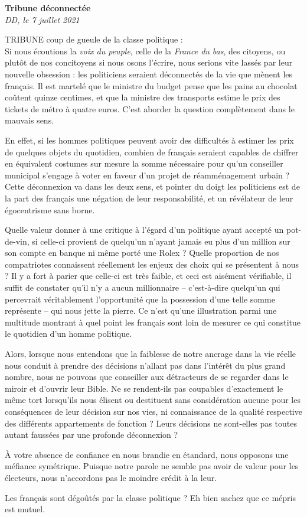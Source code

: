 \documentclass[french,12pt,amstex,a4paper]{article}
\begin{document}
\begin{center}
{\bf Tribune déconnectée}\\
{\it DD, le 7 juillet 2021}\\
\end{center}

TRIBUNE coup de gueule de la classe politique :\\

Si nous écoutions la {\it voix du peuple}, celle de la {\it France du bas}, des citoyens, ou plutôt de nos concitoyens si nous osons l'écrire, nous serions vite lassés par leur nouvelle obsession : les politiciens seraient déconnectés de la vie que mènent les français. Il est martelé que le ministre du budget pense que les pains au chocolat coûtent quinze centimes, et que la ministre des transports estime le prix des tickets de métro à quatre euros. C'est aborder la question complètement dans le mauvais sens.

En effet, si les hommes politiques peuvent avoir des difficultés à estimer les prix de quelques objets du quotidien, combien de français seraient capables de chiffrer en équivalent costumes sur mesure la somme nécessaire pour qu'un conseiller municipal s'engage à voter en faveur d'un projet de réamménagement urbain ? Cette déconnexion va dans les deux sens, et pointer du doigt les politiciens est de la part des français une négation de leur responsabilité, et un révélateur de leur égocentrisme sans borne.

Quelle valeur donner à une critique à l'égard d'un politique ayant accepté un pot-de-vin, si celle-ci provient de quelqu'un n'ayant jamais eu plus d'un million sur son compte en banque ni même porté une Rolex ? Quelle proportion de nos compatriotes connaissent réellement les enjeux des choix qui se présentent à nous ? Il y a fort à parier que celle-ci est très faible, et ceci est aisément vérifiable, il suffit de constater qu'il n'y a aucun millionnaire -- c'est-à-dire quelqu'un qui percevrait véritablement l'opportunité que la possession d'une telle somme représente -- qui nous jette la pierre. Ce n'est qu'une illustration parmi une multitude montrant à quel point les français sont loin de mesurer ce qui constitue le quotidien d'un homme politique.

Alors, lorsque nous entendons que la faiblesse de notre ancrage dans la vie réelle nous conduit à prendre des décisions n'allant pas dans l'intérêt du plus grand nombre, nous ne pouvons que conseiller aux détracteurs de se regarder dans le miroir et d'ouvrir leur Bible. Ne se rendent-ils pas coupables d'exactement le même tort lorsqu'ils nous élisent ou destituent sans considération aucune pour les conséquences de leur décision sur nos vies, ni connaissance de la qualité respective des différents appartements de fonction ? Leurs décisions ne sont-elles pas toutes autant faussées par une profonde déconnexion ?



À votre absence de confiance en nous brandie en étandard, nous opposons une méfiance symétrique. Puisque notre parole ne semble pas avoir de valeur pour les électeurs, nous n'accordons pas le moindre crédit à la leur.

Les français sont dégoûtés par la classe politique ? Eh bien sachez que ce mépris est mutuel.
\end{document}
